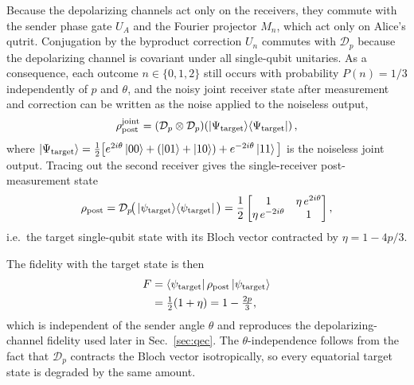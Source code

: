 \documentclass[aps,physrev,10pt,twocolumn,superscriptaddress,floatfix]{revtex4-2}
\begin{document}
Because the depolarizing channels act only on the receivers, they commute with the sender phase gate $U_A$ and the Fourier projector $M_n$, which act only on Alice's qutrit. Conjugation by the byproduct correction $U_n$ commutes with $\mathcal{D}_p$ because the depolarizing channel is covariant under all single-qubit unitaries. As a consequence, each outcome $n\in\{0,1,2\}$ still occurs with probability $P(n)=1/3$ independently of $p$ and $\theta$, and the noisy joint receiver state after measurement and correction can be written as the noise applied to the noiseless output,
\begin{align}
    \rho^{\text{joint}}_{\text{post}} = (\mathcal{D}_p \otimes \mathcal{D}_p)\!\left(\ket{\Psi_{\text{target}}}\!\bra{\Psi_{\text{target}}}\right),
\end{align}
where $\ket{\Psi_{\text{target}}} = \tfrac{1}{2}\big[e^{2i\theta}\ket{00} + (\ket{01}+\ket{10}) + e^{-2i\theta}\ket{11}\big]$ is the noiseless joint output. Tracing out the second receiver gives the single-receiver post-measurement state
\begin{align}
    \rho_{\text{post}} = \mathcal{D}_p\!\big(\ket{\psi_{\mathrm{target}}}\!\bra{\psi_{\mathrm{target}}}\big)
    = \frac{1}{2}\begin{bmatrix} 1 & \eta\, e^{2i\theta} \\ \eta\, e^{-2i\theta} & 1 \end{bmatrix},
\end{align}
i.e.\ the target single-qubit state with its Bloch vector contracted by $\eta=1-4p/3$.

The fidelity with the target state is then
\begin{align}\label{fidelity_eqn}
    F &= \bra{\psi_{\mathrm{target}}}\rho_{\text{post}}\ket{\psi_{\mathrm{target}}} \nonumber \\
    &= \tfrac{1}{2}(1 + \eta) = 1 - \tfrac{2p}{3},
\end{align}
which is independent of the sender angle $\theta$ and reproduces the depolarizing-channel fidelity used later in Sec.~\ref{sec:qec}. The $\theta$-independence follows from the fact that $\mathcal{D}_p$ contracts the Bloch vector isotropically, so every equatorial target state is degraded by the same amount.
\end{document}

